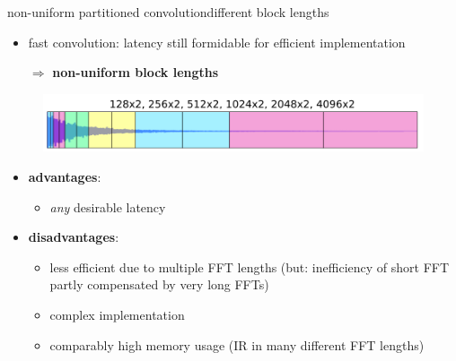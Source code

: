 \begin{frame}{non-uniform partitioned convolution}{different block lengths}
	\begin{itemize}
		\item	fast convolution: latency still formidable for efficient implementation
		\pause
		\item[$\Rightarrow$] \textbf{non-uniform block lengths}
	\end{itemize}
		\begin{figure}
		\centering
			\includegraphics[scale=.4]{graph/conv_nonuniform}
	\end{figure}
    \pause
    \begin{itemize}
        \item   \textbf{advantages}:
            \begin{itemize}
                \item   \textit{any} desirable latency
            \end{itemize}
        \item   \textbf{disadvantages}:
            \begin{itemize}
                \item   less efficient due to multiple FFT lengths (but: inefficiency of short FFT partly compensated by very long FFTs)
                \item   complex implementation
                \item   comparably high memory usage (IR in many different FFT lengths)
            \end{itemize}
    \end{itemize}

\end{frame}


